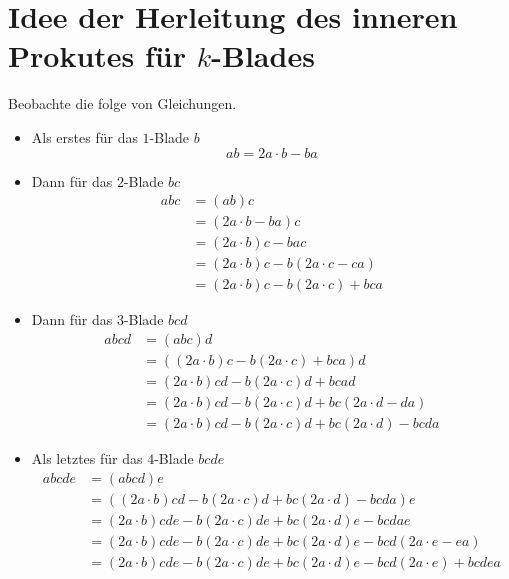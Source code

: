\documentclass{sajzk}
\begin{document}
\section{Idee der Herleitung des inneren Prokutes für $k$-Blades}
\label{3k2f}

Beobachte die folge von Gleichungen.

\begin{itemize}
\item Als erstes für das $1$-Blade $b$
$$ab = 2a\cdot b - ba$$
\item Dann für das $2$-Blade $bc$
\begin{align*}
  abc &= (ab)c \\
  &= (2a\cdot b - ba)c \\
  &= (2a\cdot b)c - bac \\
  &= (2a\cdot b)c - b(2a\cdot c - ca) \\
  &= (2a\cdot b)c - b(2a\cdot c) + bca
\end{align*}
\item Dann für das $3$-Blade $bcd$
\begin{align*}
  abcd &= (abc)d \\
  &= ((2a\cdot b)c - b(2a\cdot c) + bca)d \\
  &= (2a\cdot b)cd - b(2a\cdot c)d + bcad \\
  &= (2a\cdot b)cd - b(2a\cdot c)d + bc(2a\cdot d - da) \\
  &= (2a\cdot b)cd - b(2a\cdot c)d + bc(2a\cdot d) - bcda
\end{align*}
\item Als letztes für das $4$-Blade $bcde$
\begin{align*}
  abcde &= (abcd)e \\
  &= ((2a\cdot b)cd - b(2a\cdot c)d + bc(2a\cdot d) - bcda)e \\
  &= (2a\cdot b)cde - b(2a\cdot c)de + bc(2a\cdot d)e - bcdae \\
  &= (2a\cdot b)cde - b(2a\cdot c)de + bc(2a\cdot d)e - bcd(2a\cdot e - ea) \\
  &= (2a\cdot b)cde - b(2a\cdot c)de + bc(2a\cdot d)e - bcd(2a\cdot e)+ bcdea
\end{align*}
\end{itemize}
\end{document}
